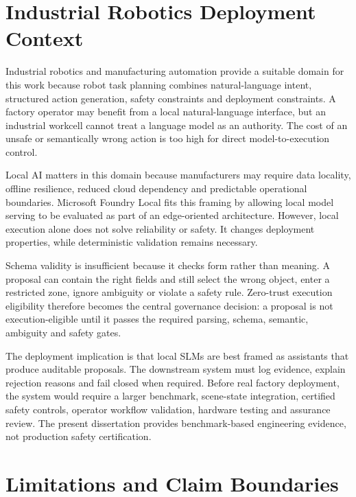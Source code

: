 \documentclass[sigconf,nonacm]{acmart}
\begin{document}
\section{Industrial Robotics Deployment Context}
\label{sec:industrial_robotics_context}

Industrial robotics and manufacturing automation provide a suitable domain for this work because robot task planning combines natural-language intent, structured action generation, safety constraints and deployment constraints. A factory operator may benefit from a local natural-language interface, but an industrial workcell cannot treat a language model as an authority. The cost of an unsafe or semantically wrong action is too high for direct model-to-execution control.

Local AI matters in this domain because manufacturers may require data locality, offline resilience, reduced cloud dependency and predictable operational boundaries. Microsoft Foundry Local fits this framing by allowing local model serving to be evaluated as part of an edge-oriented architecture. However, local execution alone does not solve reliability or safety. It changes deployment properties, while deterministic validation remains necessary.

Schema validity is insufficient because it checks form rather than meaning. A proposal can contain the right fields and still select the wrong object, enter a restricted zone, ignore ambiguity or violate a safety rule. Zero-trust execution eligibility therefore becomes the central governance decision: a proposal is not execution-eligible until it passes the required parsing, schema, semantic, ambiguity and safety gates.

The deployment implication is that local SLMs are best framed as assistants that produce auditable proposals. The downstream system must log evidence, explain rejection reasons and fail closed when required. Before real factory deployment, the system would require a larger benchmark, scene-state integration, certified safety controls, operator workflow validation, hardware testing and assurance review. The present dissertation provides benchmark-based engineering evidence, not production safety certification.

\section{Limitations and Claim Boundaries}
\label{sec:limitations_claim_boundaries}
\end{document}
